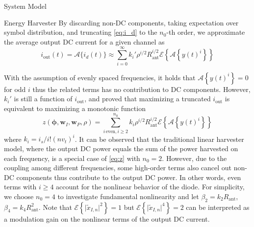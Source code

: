 \documentclass{IEEEtran}
\begin{document}
\begin{section}{System Model}
\begin{subsection}{Energy Harvester}
		By discarding non-DC components, taking expectation over symbol distribution, and truncating \ref{eq:i_d} to the $n_0$-th order, we approximate the average output DC current for a given channel as
		\begin{equation}\label{eq:i_out}
			i_{\text{out}}(t)=\mathcal{A}\{i_d(t)\}\approx\sum_{i=0}^{\infty}{k_i'}{\rho^{i/2}}{R_{\text{ant}}^{i/2}}\mathcal{E}\left\{{\mathcal{A}\left\{y(t)^i\right\}}\right\}
		\end{equation}

		With the assumption of evenly spaced frequencies, it holds that $\mathcal{A}\left\{y(t)^i\right\}=0$ for odd $i$ thus the related terms has no contribution to DC components. However, $k_i'$ is still a function of $i_{\text{out}}$, and \cite{Clerckx2016a} proved that maximizing a truncated $i_{\text{out}}$ is equivalent to maximizing a monotonic function
		\begin{equation}\label{eq:z}
			z(\boldsymbol{\phi},\boldsymbol{w}_I,\boldsymbol{w}_P,\rho)=\sum_{i\,\text{even},i\ge2}^{n_0}{k_i}{\rho^{i/2}}{R_{\text{ant}}^{i/2}}{\mathcal{E}\left\{\mathcal{A}\left\{y(t)^i\right\}\right\}}
		\end{equation}
		where $k_i=i_s/i!(nv_t)^i$. It can be observed that the traditional linear harvester model, where the output DC power equals the sum of the power harvested on each frequency, is a special case of \ref{eq:z} with $n_0=2$. However, due to the coupling among different frequencies, some high-order terms also cancel out non-DC components thus contribute to the output DC power. In other words, even terms with $i \ge 4$ account for the nonlinear behavior of the diode. For simplicity, we choose $n_0=4$ to investigate fundamental nonlinearity and let $\beta_2={k_2}{R_{\text{ant}}}$, $\beta_4={k_4}{R_{\text{ant}}^2}$. Note that $\mathcal{E}\left\{\lvert\tilde{x}_{I,n}\rvert^2\right\}=1$ but $\mathcal{E}\left\{\lvert\tilde{x}_{I,n}\rvert^4\right\}=2$ can be interpreted as a modulation gain on the nonlinear terms of the output DC current.


\end{subsection}
\end{section}
\end{document}
